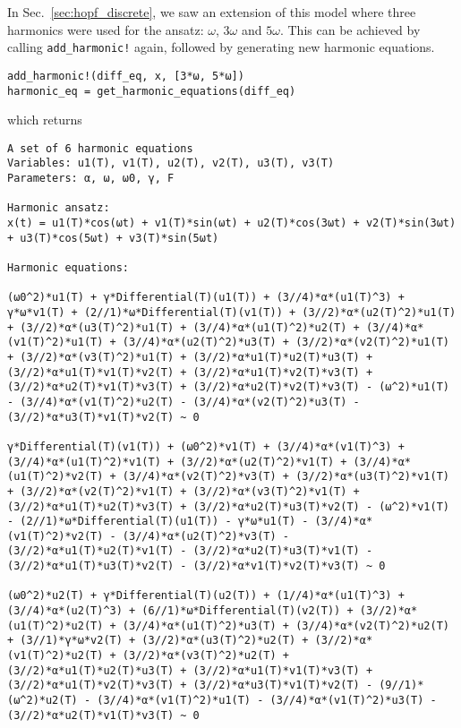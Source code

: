 In Sec.~\ref{sec:hopf_discrete}, we saw an extension of this model where three harmonics were used for the ansatz: $\omega$, $3\omega$ and $5\omega$. This can be achieved by calling \texttt{add\_harmonic!} again, followed by generating new harmonic equations.
\begin{lstlisting}[numbers=none]
add_harmonic!(diff_eq, x, [3*ω, 5*ω]) 
harmonic_eq = get_harmonic_equations(diff_eq)
\end{lstlisting}
%
which returns
\begin{lstlisting}[numbers=none, basicstyle=\scriptsize\ttfamily]
A set of 6 harmonic equations
Variables: u1(T), v1(T), u2(T), v2(T), u3(T), v3(T)
Parameters: α, ω, ω0, γ, F

Harmonic ansatz: 
x(t) = u1(T)*cos(ωt) + v1(T)*sin(ωt) + u2(T)*cos(3ωt) + v2(T)*sin(3ωt) + u3(T)*cos(5ωt) + v3(T)*sin(5ωt)

Harmonic equations:

(ω0^2)*u1(T) + γ*Differential(T)(u1(T)) + (3//4)*α*(u1(T)^3) + γ*ω*v1(T) + (2//1)*ω*Differential(T)(v1(T)) + (3//2)*α*(u2(T)^2)*u1(T) + (3//2)*α*(u3(T)^2)*u1(T) + (3//4)*α*(u1(T)^2)*u2(T) + (3//4)*α*(v1(T)^2)*u1(T) + (3//4)*α*(u2(T)^2)*u3(T) + (3//2)*α*(v2(T)^2)*u1(T) + (3//2)*α*(v3(T)^2)*u1(T) + (3//2)*α*u1(T)*u2(T)*u3(T) + (3//2)*α*u1(T)*v1(T)*v2(T) + (3//2)*α*u1(T)*v2(T)*v3(T) + (3//2)*α*u2(T)*v1(T)*v3(T) + (3//2)*α*u2(T)*v2(T)*v3(T) - (ω^2)*u1(T) - (3//4)*α*(v1(T)^2)*u2(T) - (3//4)*α*(v2(T)^2)*u3(T) - (3//2)*α*u3(T)*v1(T)*v2(T) ~ 0

γ*Differential(T)(v1(T)) + (ω0^2)*v1(T) + (3//4)*α*(v1(T)^3) + (3//4)*α*(u1(T)^2)*v1(T) + (3//2)*α*(u2(T)^2)*v1(T) + (3//4)*α*(u1(T)^2)*v2(T) + (3//4)*α*(v2(T)^2)*v3(T) + (3//2)*α*(u3(T)^2)*v1(T) + (3//2)*α*(v2(T)^2)*v1(T) + (3//2)*α*(v3(T)^2)*v1(T) + (3//2)*α*u1(T)*u2(T)*v3(T) + (3//2)*α*u2(T)*u3(T)*v2(T) - (ω^2)*v1(T) - (2//1)*ω*Differential(T)(u1(T)) - γ*ω*u1(T) - (3//4)*α*(v1(T)^2)*v2(T) - (3//4)*α*(u2(T)^2)*v3(T) - (3//2)*α*u1(T)*u2(T)*v1(T) - (3//2)*α*u2(T)*u3(T)*v1(T) - (3//2)*α*u1(T)*u3(T)*v2(T) - (3//2)*α*v1(T)*v2(T)*v3(T) ~ 0

(ω0^2)*u2(T) + γ*Differential(T)(u2(T)) + (1//4)*α*(u1(T)^3) + (3//4)*α*(u2(T)^3) + (6//1)*ω*Differential(T)(v2(T)) + (3//2)*α*(u1(T)^2)*u2(T) + (3//4)*α*(u1(T)^2)*u3(T) + (3//4)*α*(v2(T)^2)*u2(T) + (3//1)*γ*ω*v2(T) + (3//2)*α*(u3(T)^2)*u2(T) + (3//2)*α*(v1(T)^2)*u2(T) + (3//2)*α*(v3(T)^2)*u2(T) + (3//2)*α*u1(T)*u2(T)*u3(T) + (3//2)*α*u1(T)*v1(T)*v3(T) + (3//2)*α*u1(T)*v2(T)*v3(T) + (3//2)*α*u3(T)*v1(T)*v2(T) - (9//1)*(ω^2)*u2(T) - (3//4)*α*(v1(T)^2)*u1(T) - (3//4)*α*(v1(T)^2)*u3(T) - (3//2)*α*u2(T)*v1(T)*v3(T) ~ 0


\end{lstlisting}
